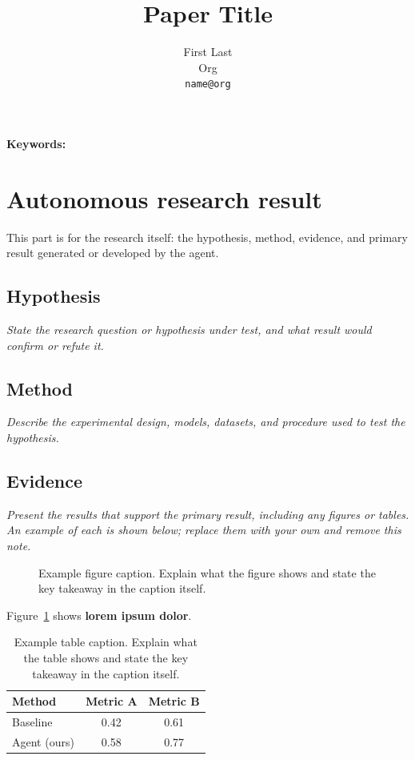 \documentclass{article}
\title{Paper Title}
\author{%
  First Last \\
  Org \\
  \texttt{name@org} \\
}
\begin{document}
\maketitle

\begin{abstract}

\end{abstract}

\noindent\textbf{Keywords:}

\section{Autonomous research result}
This part is for the research itself: the hypothesis, method, evidence, and primary result generated or developed by the agent.

\subsection{Hypothesis}
\textit{State the research question or hypothesis under test, and what result
would confirm or refute it.}


\subsection{Method}
\textit{Describe the experimental design, models, datasets, and procedure used
to test the hypothesis.}


\subsection{Evidence}
\textit{Present the results that support the primary result, including any
figures or tables. An example of each is shown below; replace them with your
own and remove this note.}

\begin{figure}[h]
  \centering
  \fbox{\rule[-.5cm]{0cm}{4cm} \rule[-.5cm]{4cm}{0cm}}
  \caption{Example figure caption. Explain what the figure shows and state the
  key takeaway in the caption itself.}
  \label{fig:example}
\end{figure}

Figure~\ref{fig:example} shows \textbf{lorem ipsum dolor}.

\begin{table}[h]
  \caption{Example table caption. Explain what the table shows and state the
  key takeaway in the caption itself.}
  \label{tab:example}
  \centering
  \begin{tabular}{lcc}
    \toprule
    Method & Metric A & Metric B \\
    \midrule
    Baseline & 0.42 & 0.61 \\
    Agent (ours) & 0.58 & 0.77 \\
    \bottomrule
  \end{tabular}
\end{table}
\end{document}
